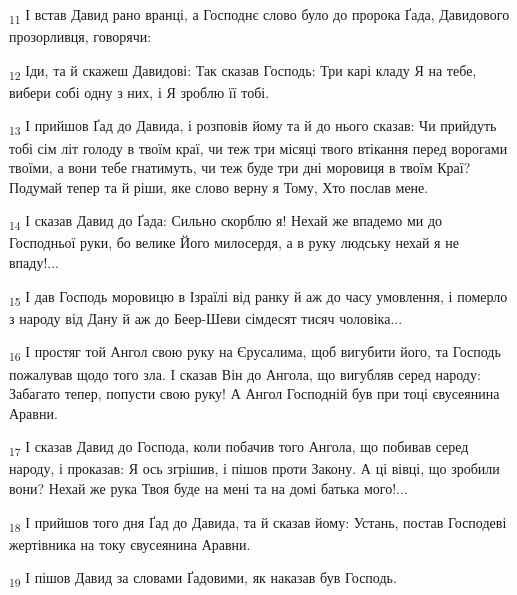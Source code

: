 \begin{tcolorbox}
\textsubscript{11} І встав Давид рано вранці, а Господнє слово було до пророка Ґада, Давидового прозорливця, говорячи:
\end{tcolorbox}
\begin{tcolorbox}
\textsubscript{12} Іди, та й скажеш Давидові: Так сказав Господь: Три карі кладу Я на тебе, вибери собі одну з них, і Я зроблю її тобі.
\end{tcolorbox}
\begin{tcolorbox}
\textsubscript{13} І прийшов Ґад до Давида, і розповів йому та й до нього сказав: Чи прийдуть тобі сім літ голоду в твоїм краї, чи теж три місяці твого втікання перед ворогами твоїми, а вони тебе гнатимуть, чи теж буде три дні моровиця в твоїм Краї? Подумай тепер та й ріши, яке слово верну я Тому, Хто послав мене.
\end{tcolorbox}
\begin{tcolorbox}
\textsubscript{14} І сказав Давид до Ґада: Сильно скорблю я! Нехай же впадемо ми до Господньої руки, бо велике Його милосердя, а в руку людську нехай я не впаду!...
\end{tcolorbox}
\begin{tcolorbox}
\textsubscript{15} І дав Господь моровицю в Ізраїлі від ранку й аж до часу умовлення, і померло з народу від Дану й аж до Беер-Шеви сімдесят тисяч чоловіка...
\end{tcolorbox}
\begin{tcolorbox}
\textsubscript{16} І простяг той Ангол свою руку на Єрусалима, щоб вигубити його, та Господь пожалував щодо того зла. І сказав Він до Ангола, що вигубляв серед народу: Забагато тепер, попусти свою руку! А Ангол Господній був при тоці євусеянина Аравни.
\end{tcolorbox}
\begin{tcolorbox}
\textsubscript{17} І сказав Давид до Господа, коли побачив того Ангола, що побивав серед народу, і проказав: Я ось згрішив, і пішов проти Закону. А ці вівці, що зробили вони? Нехай же рука Твоя буде на мені та на домі батька мого!...
\end{tcolorbox}
\begin{tcolorbox}
\textsubscript{18} І прийшов того дня Ґад до Давида, та й сказав йому: Устань, постав Господеві жертівника на току євусеянина Аравни.
\end{tcolorbox}
\begin{tcolorbox}
\textsubscript{19} І пішов Давид за словами Ґадовими, як наказав був Господь.
\end{tcolorbox}
